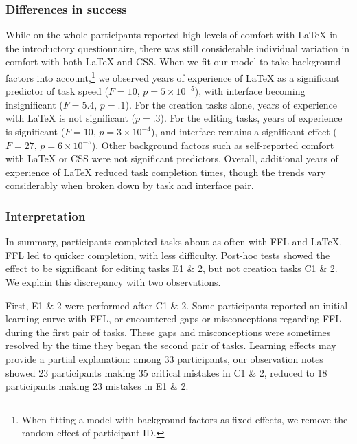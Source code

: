 \subsubsection{Differences in success}

While on the whole participants reported high levels of comfort with LaTeX in the introductory questionnaire, there was still considerable individual variation in comfort with both LaTeX and CSS. When we fit our model to take background factors into account,\footnote{When fitting a model with background factors as fixed effects, we remove the random effect of participant ID.} we observed years of experience of LaTeX as a significant predictor of task speed ($F=10$, $p=5\times10^{-5}$), with interface becoming insignificant ($F=5.4$, $p=.1$). For the creation tasks alone, years of experience with LaTeX is not significant  ($p=.3$). For the editing tasks, years of experience is significant ($F=10$, $p=3\times10^{-4}$), and interface remains a significant effect ($F=27$, $p=6\times10^{-5}$). Other background factors such as self-reported comfort with LaTeX or CSS were not significant predictors. Overall, additional years of experience of LaTeX reduced task completion times, though the trends vary considerably when broken down by task and interface pair.

\subsubsection{Interpretation}

In summary, participants completed tasks about as often with FFL and LaTeX. FFL led to quicker completion, with less difficulty. Post-hoc tests showed the effect to be significant for editing tasks E1 \& 2, but not creation tasks C1 \& 2. We explain this discrepancy with two observations. 

First, E1 \& 2 were performed after C1 \& 2. Some participants reported an initial learning curve with FFL, or encountered gaps or misconceptions regarding FFL during the first pair of tasks. These gaps and misconceptions were sometimes resolved by the time they began the second pair of tasks. Learning effects may provide a partial explanation: among 33 participants, our observation notes showed 23 participants making 35 critical mistakes  in C1 \& 2, reduced to 18 participants making 23 mistakes in E1 \& 2.

